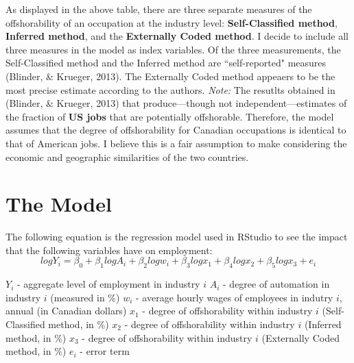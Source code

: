 \documentclass[12pt]{article}
\begin{document}
\begin{flushleft}
As displayed in the above table, there are three separate measures of the offshorability of an occupation at the industry level: \textbf{Self-Classified method}, \textbf{Inferred method}, and the \textbf{Externally Coded method}. I decide to include all three measures in the model as index variables. Of the three measurements, the Self-Classified method and the Inferred method are ``self-reported" measures (Blinder, \& Krueger, 2013). The Externally Coded method appeaers to be the most precise estimate according to the authors.
\break
\linebreak
\textit{Note:} The resutlts obtained in (Blinder, \& Krueger, 2013) that produce—though not independent—estimates of the fraction of \textbf{US jobs} that are potentially offshorable. Therefore, the model assumes that the degree of offshorability for Canadian occupations is identical to that of American jobs. I  believe this is a fair assumption to make considering the economic and geographic similarities of the two countries.
\end{flushleft}

\newpage

\section{The Model}
The following equation is the regression model used in RStudio to see the impact that the following variables have on employment:
\begingroup
\Large$$logY_i=\beta_0 + \beta_1 log A_i + \beta_2 log w_i  + \beta_3 log x_1  + \beta_4 log x_2 + \beta_5 log x_3 + e_i$$ 
\endgroup
\begin{flushleft}
$Y_i$ - aggregate level of employment in industry $i$
\break
\linebreak
$A_i$ - degree of automation in industry $i$ (measured in \%)
\break
\linebreak
$w_i$ - average hourly wages of employees in indutry $i$, annual (in Canadian dollars)
\break
\linebreak
$x_1$ - degree of offshorability within industry $i$ (Self-Classified method, in \%)
\break
\linebreak
$x_2$ - degree of offshorability within industry $i$ (Inferred method, in \%)
\break
\linebreak
$x_3$ - degree of offshorability within industry $i$ (Externally Coded method, in \%)
\break
\linebreak
$e_i$ - error term
\end{flushleft}
\end{document}
